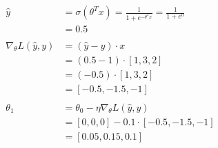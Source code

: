 \documentclass[a4paper]{article}
\theoremstyle{definition}
\newenvironment{soln}{
    \leavevmode\color{blue}\ignorespaces
}{}
\begin{document}
\begin{enumerate}
\begin{enumerate}
		            \begin{soln}
			            \begin{align*}
				            \hat{y}                       & = \sigma(\theta^Tx) = \frac{1}{1 + e^{-\theta^Tx}} = \frac{1}{1 + e^{0}} \\
				                                          & = 0.5                                                                    \\\\
				            \nabla_{\theta} L(\hat{y}, y) & = (\hat{y} - y) \cdot x                                                  \\
				                                          & = (0.5 - 1) \cdot [1, 3, 2]                                              \\
				                                          & = (-0.5) \cdot [1, 3, 2]                                                 \\
				                                          & = [-0.5, -1.5, -1]                                                       \\\\
				            \theta_1                      & = \theta_0 - \eta \nabla_{\theta} L(\hat{y}, y)                          \\
				                                          & = [0, 0, 0] - 0.1 \cdot [-0.5, -1.5, -1]                                 \\
				                                          & = [0.05, 0.15, 0.1]                                                      \\
			            \end{align*}

		            \end{soln}

	      \end{enumerate}
\end{enumerate}

\pagebreak
\end{document}
